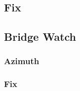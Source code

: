 \documentclass[letterpaper,12pt]{article}
\begin{document}
\subsection{Fix}
\subsection{Bridge Watch}
\subsubsection{Azimuth} \label{doubleget}
\subsubsection{Fix}
\printbibliography
\end{document}

